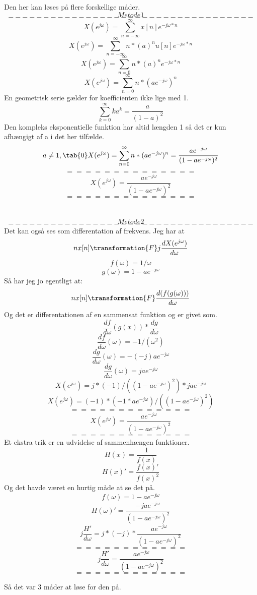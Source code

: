 \begin{Udledninger}
\begin{underrubrik}
    \end{underrubrik}
    \begin{underrubrik}
        Den her kan løses på flere forskellige måder. 
        \[Metode 1\]
        \[-----------------------------------\]
        \[X(e^{j\omega}) = \sum_{n = -\infty}^{\infty}x[n]e^{-j\omega*n}\]
        \[X(e^{j\omega}) = \sum_{n = -\infty}^{\infty}n*(a)^nu[n]e^{-j\omega*n}\]
        \[X(e^{j\omega}) = \sum_{n = 0}^{\infty}n*(a)^ne^{-j\omega*n}\]
        \[X(e^{j\omega}) = \sum_{n = 0}^{\infty}n*(ae^{-j\omega})^n\]
        En geometrisk serie gælder for koefficienten ikke lige med 1. 
        \[\sum_{k=0}^{\infty}k a^{k}=\frac{a}{(1-a)^{2}}\]
        Den kompleks eksponentielle funktion har altid længden 1 så det er kun afhængigt af a i det her tilfælde.
        \[a \neq 1,\tab{0} X(e^{j\omega}) = \sum_{n = 0}^{\infty}n*(ae^{-j\omega})^n = \frac{ae^{-j\omega}}{(1 - ae^{-j\omega})^2}\]
        \[==============\]
        \[X(e^{j\omega}) = \frac{ae^{-j\omega}}{(1 - ae^{-j\omega})^2}\]
        \[==============\]\\\\

        \[Metode 2\]
        \[-----------------------------------\]
        Det kan også ses som differentation af frekvens. Jeg har at 
        \[n x[n] \transformation{F} j{\frac{d X(e^{j\omega})}{d\omega}} \]
        \[f(\omega) = 1/\omega\]
        \[g(\omega) = 1 - ae^{-j\omega}\]
        Så har jeg jo egentligt at: 
        \[n x[n] \transformation{F} \frac{d(f(g(\omega)))}{d\omega}\]
        Og det er differentationen af en sammensat funktion og er givet som.
        \[\frac{df}{d\omega}(g(x)) * \frac{dg}{d\omega}\]
        \[\frac{df}{d\omega}(\omega) = -1/(\omega^2)\]
        \[\frac{dg}{d\omega}(\omega) = - (-j)ae^{-j\omega}\]
        \[\frac{dg}{d\omega}(\omega) = jae^{-j\omega}\]
        \[X(e^{j\omega}) = j * (-1)/((1 - ae^{-j\omega})^2) * jae^{-j\omega}\]
        \[X(e^{j\omega}) = (-1) * (-1 * ae^{-j\omega})/((1 - ae^{-j\omega})^2)\]
        \[=============\]
        \[X(e^{j\omega}) = \frac{ae^{-j\omega}}{(1 - ae^{-j\omega})^2}\]
        \[=============\]
        Et ekstra trik er en udvidelse af sammenhængen funktioner. 
        \[H(x)  = \frac{1}{f(x)}\]
        \[H(x)' = \frac{f(x)'}{f(x)^2}\]
        Og det havde været en hurtig måde at se det på. 
        \[f(\omega) = 1 - ae^{-j\omega}\]
        \[H(\omega)' = \frac{-jae^{-j\omega}}{(1 - ae^{-j\omega})^2}\]
        \[j\frac{H'}{d\omega} = j*(-j)*\frac{ae^{-j\omega}}{(1 - ae^{-j\omega})^2}\]
        \[============\]
        \[j\frac{H'}{d\omega} = \frac{ae^{-j\omega}}{(1 - ae^{-j\omega})^2}\]
        \[============\]

        Så det var 3 måder at løse for den på. 
    \end{underrubrik}

\end{Udledninger}